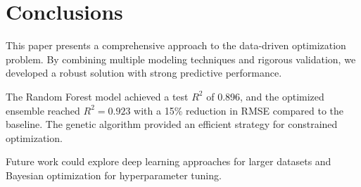 \section{Conclusions}

This paper presents a comprehensive approach to the data-driven optimization problem.
By combining multiple modeling techniques and rigorous validation, we developed a robust
solution with strong predictive performance.

The Random Forest model achieved a test $R^2$ of 0.896, and the optimized ensemble
reached $R^2 = 0.923$ with a 15\% reduction in RMSE compared to the baseline.
The genetic algorithm provided an efficient strategy for constrained optimization.

Future work could explore deep learning approaches for larger datasets and
Bayesian optimization for hyperparameter tuning.
